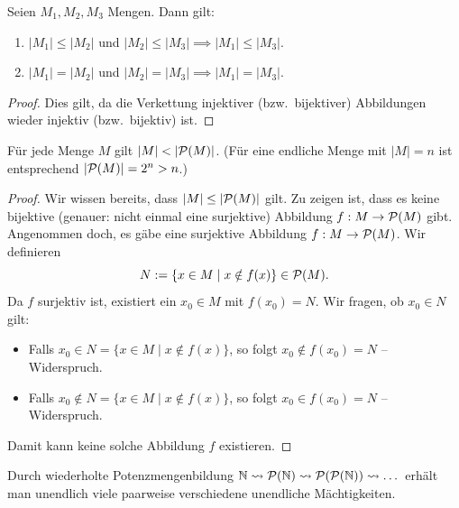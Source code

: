 \begin{satz}[Transitivität]
Seien $M_1,M_2,M_3$ Mengen. Dann gilt:
\begin{enumerate}
    \item $|M_1|\le|M_2|$ und $|M_2|\le|M_3|\implies |M_1|\le|M_3|$.
    \item $|M_1|=|M_2|$ und $|M_2|=|M_3|\implies |M_1|=|M_3|$.
\end{enumerate}
\end{satz}
\begin{proof}
Dies gilt, da die Verkettung injektiver (bzw.\ bijektiver) Abbildungen
wieder injektiv (bzw.\ bijektiv) ist.
\end{proof}

\begin{satz}
Für jede Menge $M$ gilt $|M|<|\Pot(M)|$.
(Für eine endliche Menge mit $|M|=n$ ist entsprechend $|\mathcal{P}(M)|=2^n>n$.)
\end{satz}
\begin{proof}
Wir wissen bereits, dass $|M|\le|\mathcal{P}(M)|$ gilt. Zu zeigen ist, dass es
keine bijektive (genauer: nicht einmal eine surjektive) Abbildung
$f:M\to\mathcal{P}(M)$ gibt.
Angenommen doch, es gäbe eine surjektive Abbildung $f:M\to\mathcal{P}(M)$.
Wir definieren
\[
    N:=\{x\in M\mid x\notin f(x)\}\in\mathcal{P}(M).
\]
Da $f$ surjektiv ist, existiert ein $x_0\in M$ mit $f(x_0)=N$.
Wir fragen, ob $x_0\in N$ gilt:
\begin{itemize}
    \item Falls $x_0\in N=\{x\in M\mid x\notin f(x)\}$, so folgt
    $x_0\notin f(x_0)=N$ -- Widerspruch.
    \item Falls $x_0\notin N=\{x\in M\mid x\notin f(x)\}$, so folgt
    $x_0\in f(x_0)=N$ -- Widerspruch.
\end{itemize}
Damit kann keine solche Abbildung $f$ existieren.
\end{proof}

\begin{bemerkung}
Durch wiederholte Potenzmengenbildung $\mathbb{N}\rightsquigarrow\mathcal{P}(\mathbb{N})
\rightsquigarrow\mathcal{P}(\mathcal{P}(\mathbb{N}))\rightsquigarrow\dots$ erhält man
unendlich viele paarweise verschiedene unendliche Mächtigkeiten.
\end{bemerkung}

